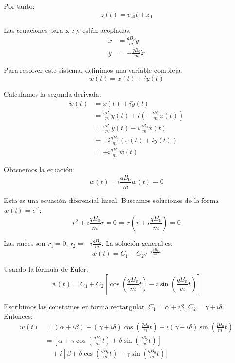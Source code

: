 \documentclass{article}
\begin{document}
Por tanto:
\begin{equation}
z(t) = v_{z0} t + z_0
\end{equation}


Las ecuaciones para x e y están acopladas:
\begin{align}
\ddot{x} &= \frac{qB_0}{m} \dot{y} \\
\ddot{y} &= -\frac{qB_0}{m} \dot{x}
\end{align}

Para resolver este sistema, definimos una variable compleja:
\begin{equation}
w(t) = x(t) + iy(t)
\end{equation}

Calculamos la segunda derivada:
\begin{align}
\ddot{w}(t) &= \ddot{x}(t) + i\ddot{y}(t) \\
&= \frac{qB_0}{m} \dot{y}(t) + i\left(-\frac{qB_0}{m} \dot{x}(t)\right) \\
&= \frac{qB_0}{m} \dot{y}(t) - i\frac{qB_0}{m} \dot{x}(t) \\
&= -i\frac{qB_0}{m} (\dot{x}(t) + i\dot{y}(t)) \\
&= -i\frac{qB_0}{m} \dot{w}(t)
\end{align}

Obtenemos la ecuación:
\begin{equation}
\ddot{w}(t) + i\frac{qB_0}{m} \dot{w}(t) = 0
\end{equation}

Esta es una ecuación diferencial lineal. Buscamos soluciones de la forma $w(t) = e^{rt}$:
\begin{equation}
r^2 + i\frac{qB_0}{m} r = 0 \Rightarrow r(r + i\frac{qB_0}{m}) = 0
\end{equation}

Las raíces son $r_1 = 0$, $r_2 = -i\frac{qB_0}{m}$. La solución general es:
\begin{equation}
w(t) = C_1 + C_2 e^{-i\frac{qB_0}{m}t}
\end{equation}

Usando la fórmula de Euler:
\begin{equation}
w(t) = C_1 + C_2 \left[\cos\left(\frac{qB_0}{m}t\right) - i\sin\left(\frac{qB_0}{m}t\right)\right]
\end{equation}

Escribimos las constantes en forma rectangular: $C_1 = \alpha + i\beta$, $C_2 = \gamma + i\delta$. Entonces:
\begin{align}
w(t) &= (\alpha + i\beta) + (\gamma + i\delta)\cos\left(\frac{qB_0}{m}t\right) - i(\gamma + i\delta)\sin\left(\frac{qB_0}{m}t\right) \\
&= [\alpha + \gamma\cos\left(\frac{qB_0}{m}t\right) + \delta\sin\left(\frac{qB_0}{m}t\right)] \\
&\quad + i[\beta + \delta\cos\left(\frac{qB_0}{m}t\right) - \gamma\sin\left(\frac{qB_0}{m}t\right)]
\end{align}
\end{document}
